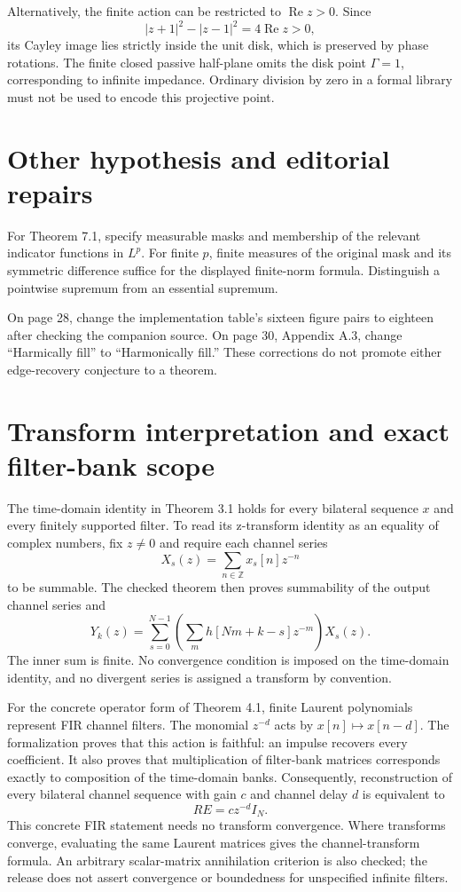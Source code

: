 \documentclass[11pt]{article}
\begin{document}
Alternatively, the finite action can be restricted to $\operatorname{Re}z>0$. Since
\[
|z+1|^2-|z-1|^2=4\operatorname{Re}z>0,
\]
its Cayley image lies strictly inside the unit disk, which is preserved by phase rotations. The finite closed passive half-plane omits the disk point $\Gamma=1$, corresponding to infinite impedance. Ordinary division by zero in a formal library must not be used to encode this projective point.

\section{Other hypothesis and editorial repairs}
For Theorem 7.1, specify measurable masks and membership of the relevant indicator functions in $L^p$. For finite $p$, finite measures of the original mask and its symmetric difference suffice for the displayed finite-norm formula. Distinguish a pointwise supremum from an essential supremum.

On page 28, change the implementation table's sixteen figure pairs to eighteen after checking the companion source. On page 30, Appendix A.3, change ``Harmically fill'' to ``Harmonically fill.'' These corrections do not promote either edge-recovery conjecture to a theorem.

\section{Transform interpretation and exact filter-bank scope}
The time-domain identity in Theorem 3.1 holds for every bilateral sequence $x$ and every finitely supported filter. To read its z-transform identity as an equality of complex numbers, fix $z\ne0$ and require each channel series
\[
X_s(z)=\sum_{n\in\mathbb Z}x_s[n]z^{-n}
\]
to be summable. The checked theorem then proves summability of the output channel series and
\[
Y_k(z)=\sum_{s=0}^{N-1}\left(\sum_m h[Nm+k-s]z^{-m}\right)X_s(z).
\]
The inner sum is finite. No convergence condition is imposed on the time-domain identity, and no divergent series is assigned a transform by convention.

For the concrete operator form of Theorem 4.1, finite Laurent polynomials represent FIR channel filters. The monomial $z^{-d}$ acts by $x[n]\mapsto x[n-d]$. The formalization proves that this action is faithful: an impulse recovers every coefficient. It also proves that multiplication of filter-bank matrices corresponds exactly to composition of the time-domain banks. Consequently, reconstruction of every bilateral channel sequence with gain $c$ and channel delay $d$ is equivalent to
\[
R E=c z^{-d}I_N.
\]
This concrete FIR statement needs no transform convergence. Where transforms converge, evaluating the same Laurent matrices gives the channel-transform formula. An arbitrary scalar-matrix annihilation criterion is also checked; the release does not assert convergence or boundedness for unspecified infinite filters.
\end{document}
